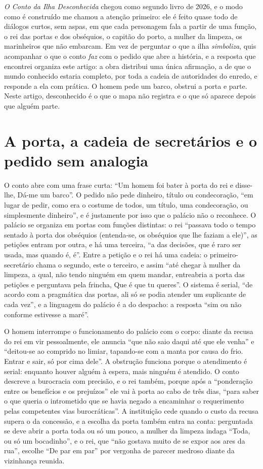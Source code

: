\documentclass[12pt]{article}
\begin{document}
\emph{O Conto da Ilha Desconhecida} chegou como segundo livro de 2026, e o modo como é construído me chamou a atenção primeiro: ele é feito quase todo de diálogos curtos, sem aspas, em que cada personagem fala a partir de uma função, o rei das portas e dos obséquios, o capitão do porto, a mulher da limpeza, os marinheiros que não embarcam. Em vez de perguntar o que a ilha \emph{simboliza}, quis acompanhar o que o conto \emph{faz} com o pedido que abre a história, e a resposta que encontrei organiza este artigo: a obra distribui uma única afirmação, a de que o mundo conhecido estaria completo, por toda a cadeia de autoridades do enredo, e responde a ela com prática. O homem pede um barco, obstrui a porta e parte. Neste artigo, desconhecido é o que o mapa não registra e o que só aparece depois que alguém parte.

\section{A porta, a cadeia de secretários e o pedido sem analogia}

O conto abre com uma frase curta: ``Um homem foi bater à porta do rei e disse-lhe, Dá-me um barco''. O pedido não pede dinheiro, título ou condecoração, ``em lugar de pedir, como era o costume de todos, um título, uma condecoração, ou simplesmente dinheiro'', e é justamente por isso que o palácio não o reconhece. O palácio se organiza em portas com funções distintas: o rei ``passava todo o tempo sentado à porta dos obséquios (entenda-se, os obséquios que lhe faziam a ele)'', as petições entram por outra, e há uma terceira, ``a das decisões, que é raro ser usada, mas quando é, é''. Entre a petição e o rei há uma cadeia: o primeiro-secretário chama o segundo, este o terceiro, e assim ``até chegar à mulher da limpeza, a qual, não tendo ninguém em quem mandar, entreabria a porta das petições e perguntava pela frincha, Que é que tu queres''. O sistema é serial, ``de acordo com a pragmática das portas, ali só se podia atender um suplicante de cada vez'', e a linguagem do palácio é a do despacho: a resposta ``sim ou não conforme estivesse a maré''.

O homem interrompe o funcionamento do palácio com o corpo: diante da recusa do rei em vir pessoalmente, ele anuncia ``que não saio daqui até que ele venha'' e ``deitou-se ao comprido no limiar, tapando-se com a manta por causa do frio. Entrar e sair, só por cima dele''. A obstrução funciona porque o atendimento é serial: enquanto houver alguém à espera, mais ninguém é atendido. O conto descreve a burocracia com precisão, e o rei também, porque após a ``ponderação entre os benefícios e os prejuízos'' ele vai à porta ao cabo de três dias, ``para saber o que queria o intrometido que se havia negado a encaminhar o requerimento pelas competentes vias burocráticas''. A instituição cede quando o custo da recusa supera o da concessão, e a escolha da porta também entra na conta: perguntada se deve abrir a porta toda ou só um pouco, a mulher da limpeza indaga ``Toda, ou só um bocadinho'', e o rei, que ``não gostava muito de se expor aos ares da rua'', escolhe ``De par em par'' por vergonha de parecer medroso diante da vizinhança reunida.
\end{document}
